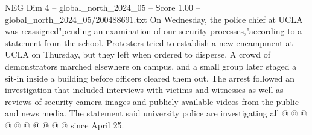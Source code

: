 \begin{textsample}{NEG Dim 4 – global\_north\_2024\_05 – Score 1.00 – global\_north\_2024\_05/200488691.txt}
On Wednesday, the police chief at UCLA was reassigned"pending an examination of our security processes,"according to a statement from the school.
Protesters tried to establish a new encampment at UCLA on Thursday, but they left when ordered to disperse.
A crowd of demonstrators marched elsewhere on campus, and a small group later staged a sit-in inside a building before officers cleared them out.
The arrest followed an investigation that included interviews with victims and witnesses as well as reviews of security camera images and publicly available videos from the public and news media.
The statement said university police are investigating all @ @ @ @ @ @ @ @ @ @ since April 25.

\end{textsample}

